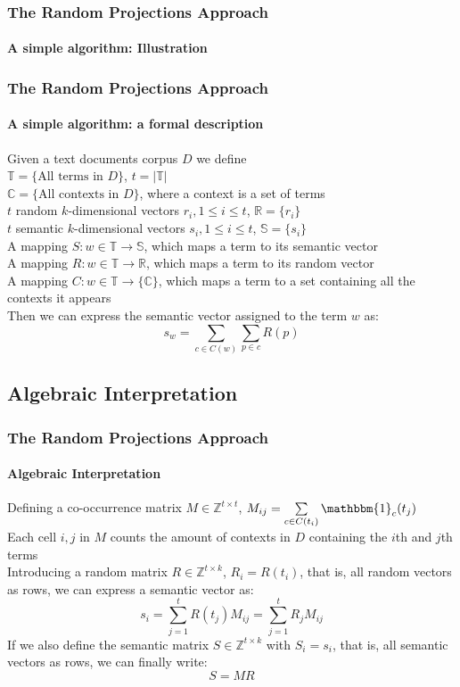 \documentclass{beamer}
\begin{document}
\begin{frame}
	\frametitle{The Random Projections Approach}
	\framesubtitle{A simple algorithm: Illustration}
\end{frame}	

\begin{frame}
	\frametitle{The Random Projections Approach}
	\framesubtitle{A simple algorithm: a formal description}

Given a text documents corpus $D$ we define \\
$\mathbb{T}=\{\text{All terms in } D\}$, $t =  \left\vert{\mathbb{T}}\right\vert$ \\
$\mathbb{C} = \{\text{All contexts in } D\}$, where a context is a set of terms \\
$t$ random $k$-dimensional vectors $r_i, 1\leq i\leq t$,  $\mathbb{R} = \{r_i\}$ \\
$t$ semantic $k$-dimensional vectors $s_i, 1\leq i\leq t$,  $\mathbb{S} = \{s_i\}$ \\
A mapping $S:w \in \mathbb{T} \rightarrow  \mathbb{S}$, which maps a term to its semantic vector \\
A mapping $R:w \in \mathbb{T} \rightarrow  \mathbb{R}$, which maps a term to its random vector \\
A mapping $C:w \in \mathbb{T} \rightarrow  \{\mathbb{C}\}$, which maps a term to a set containing all the contexts it appears \\
Then we can express the semantic vector assigned to the term $w$ as: \\
\begin{equation}
s_w =\sum\limits_{c \in C(w)} \sum\limits_{p \in c} R(p)
\end{equation}
\end{frame}

\subsection{Algebraic Interpretation}

\begin{frame}
  	\frametitle{The Random Projections Approach}
  	\framesubtitle{Algebraic Interpretation}
  	
Defining a co-occurrence matrix $M \in \mathbb{Z}^{t \times t} $, $M_{ij} = \sum\limits_{c \in C(t_i)} \mathbbm{1}_c (t_j)$ \\
Each cell $i, j$ in $M$ counts the amount of contexts in $D$ containing the $i$th and $j$th terms\\
Introducing a random matrix $R \in \mathbb{Z}^{t \times k} $,  $R_i = R(t_i)$, that is, all random vectors as rows, we can express a semantic vector as:\\
\begin{equation}
s_i =\sum\limits_{j=1}^{t} R(t_j)M_{ij} =\sum\limits_{j=1}^{t} R_jM_{ij}
\end{equation}
If we also define the semantic matrix $S \in \mathbb{Z}^{t \times k} $ with $S_i = s_i$, that is, all semantic vectors as rows, we can finally write:\\
\begin{equation}
S=MR
\end{equation}
\end{frame}
\end{document}
